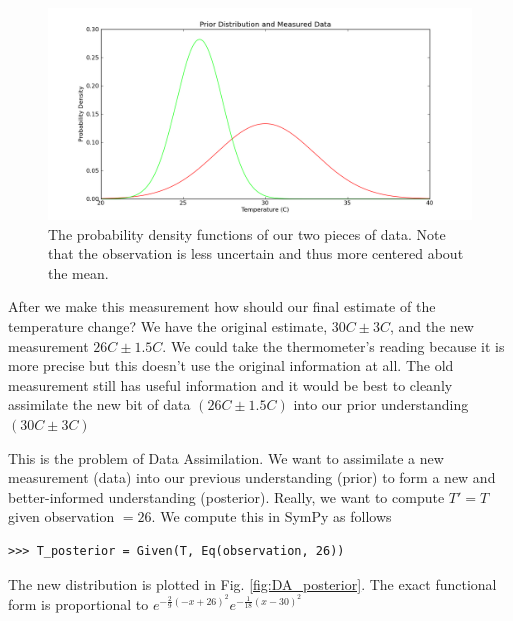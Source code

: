 \begin{figure}[ht]
\vspace{-0pt}
\centering
\includegraphics[width=.7\textwidth]{images/data.png}
\vspace{-0pt}
\caption{The probability density functions of our two pieces of data. Note that the observation is less uncertain and thus more centered about the mean.}
\label{fig:DA_data}
\vspace{00pt}
\end{figure}

After we make this measurement how should our final estimate of the temperature change? We have the original estimate, $30C \pm 3C$, and the new measurement $26C \pm 1.5C$. We could take the thermometer's reading because it is more precise but this doesn't use the original information at all. The old measurement still has useful information and it would be best to cleanly assimilate the new bit of data $(26C \pm 1.5C)$ into our prior understanding $(30C \pm 3C)$

This is the problem of Data Assimilation. We want to assimilate a new measurement (data) into our previous understanding (prior) to form a new and better-informed understanding (posterior). Really, we want to compute $T' = T$ given observation $= 26$. We compute this in SymPy as follows

\begin{lstlisting}
>>> T_posterior = Given(T, Eq(observation, 26))
\end{lstlisting}

The new distribution is plotted in Fig. \ref{fig:DA_posterior}. The exact functional form is proportional to $e^{-\frac{2}{9} \left(-x + 26\right)^{2}} e^{-\frac{1}{18} \left(x-30\right)^{2}}$ 

